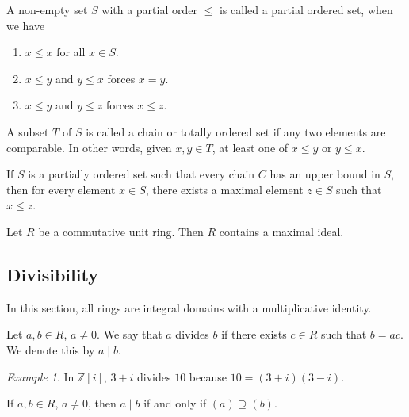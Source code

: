 \documentclass[11pt]{article}
\newcommand{\Z}{\mathbb{Z}}
\theoremstyle{definition}
\theoremstyle{remark}
\newtheorem*{example}{Example}
\numberwithin{equation}{section}
\begin{document}
    \begin{definition}
        A non-empty set $S$ with a partial order $\leq$ is called a partial ordered
        set, when we have \begin{enumerate}
            \itemsep0em
            \item $x \leq x$ for all $x \in S$.
            \item $x \leq y$ and $y \leq x$ forces $x = y$.
            \item $x \leq y$ and $y \leq z$ forces $x \leq z$.
        \end{enumerate}
    \end{definition}

    \begin{definition}
        A subset $T$ of $S$ is called a chain or totally ordered set if any two
        elements are comparable. In other words, given $x, y \in T$, at least one of
        $x \leq y$ or $y \leq x$.
    \end{definition}

    \begin{lemma}
        If $S$ is a partially ordered set such that every chain $C$ has an upper
        bound in $S$, then for every element $x \in S$, there exists a maximal
        element $z \in S$ such that $x \leq z$.
    \end{lemma}

    \begin{theorem}
        Let $R$ be a commutative unit ring. Then $R$ contains a maximal ideal.
    \end{theorem}



    \subsection{Divisibility}
    
    In this section, all rings are integral domains with a multiplicative identity.

    \begin{definition}
        Let $a, b \in R$, $a \neq 0$. We say that $a$ divides $b$ if there exists $c
        \in R$ such that $b = ac$. We denote this by $a\mid b$.
    \end{definition}
    \begin{example}
        In $\Z[i]$, $3 + i$ divides $10$ because $10 = (3 + i)(3 - i)$.
    \end{example}

    \begin{lemma}
        If $a, b \in R$, $a \neq 0$, then $a \mid b$ if and only if $(a)
        \supseteq (b)$.
    \end{lemma}
\end{document}
